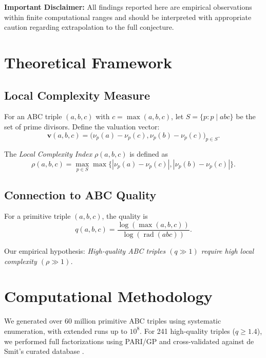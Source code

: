 \documentclass[11pt,a4paper]{article}
\DeclareMathOperator{\rad}{rad}
\begin{document}
\textbf{Important Disclaimer:} All findings reported here are empirical observations within finite computational ranges and should be interpreted with appropriate caution regarding extrapolation to the full conjecture.

\section{Theoretical Framework}

\subsection{Local Complexity Measure}

\begin{definition}
For an ABC triple $(a,b,c)$ with $c = \max(a,b,c)$, let $S=\{p : p \mid abc\}$ be the set of prime divisors. Define the valuation vector:
\[
\mathbf{v}(a,b,c) = \big(\nu_p(a) - \nu_p(c), \nu_p(b) - \nu_p(c)\big)_{p \in S}.
\]
\end{definition}

\begin{definition}
The \emph{Local Complexity Index} $\rho(a,b,c)$ is defined as
\[
\rho(a,b,c) = \max_{p \in S} \max \{ |\nu_p(a)-\nu_p(c)|, |\nu_p(b)-\nu_p(c)|\}.
\]
\end{definition}

\subsection{Connection to ABC Quality}

\begin{definition}
For a primitive triple $(a,b,c)$, the quality is
\[
q(a,b,c) = \frac{\log(\max(a,b,c))}{\log(\rad(abc))}.
\]
\end{definition}

Our empirical hypothesis: \emph{High-quality ABC triples $(q \gg 1)$ require high local complexity $(\rho \gg 1)$.}

\section{Computational Methodology}

We generated over $60$ million primitive ABC triples using systematic enumeration, with extended runs up to $10^8$. For 241 high-quality triples ($q \geq 1.4$), we performed full factorizations using PARI/GP and cross-validated against de Smit’s curated database \citep{desmit2024abcdb}.
\end{document}
